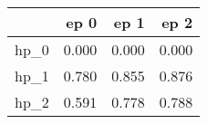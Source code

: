 \begin{tabular}{lrrr}
\toprule
{} &   ep 0 &   ep 1 &   ep 2 \\
\midrule
hp\_0 &  0.000 &  0.000 &  0.000 \\
hp\_1 &  0.780 &  0.855 &  0.876 \\
hp\_2 &  0.591 &  0.778 &  0.788 \\
\bottomrule
\end{tabular}

